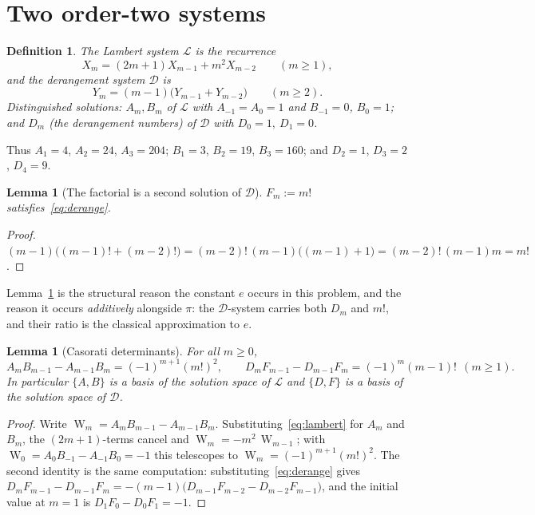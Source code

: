 \documentclass[11pt]{article}
\newtheorem{lemma}[theorem]{Lemma}
\newtheorem{definition}[theorem]{Definition}
\theoremstyle{remark}
\DeclareMathOperator{\Cas}{W}
\begin{document}
\section{Two order-two systems}

\begin{definition}
The \emph{Lambert system} $\mathcal{L}$ is the recurrence
\begin{equation}\label{eq:lambert}
X_m = (2m+1)X_{m-1} + m^2 X_{m-2} \qquad (m \ge 1),
\end{equation}
and the \emph{derangement system} $\mathcal{D}$ is
\begin{equation}\label{eq:derange}
Y_m = (m-1)\bigl(Y_{m-1} + Y_{m-2}\bigr) \qquad (m \ge 2).
\end{equation}
Distinguished solutions: $A_m,B_m$ of $\mathcal{L}$ with
$A_{-1}=A_0=1$ and $B_{-1}=0$, $B_0=1$; and $D_m$ (the derangement numbers) of
$\mathcal{D}$ with $D_0=1,\ D_1=0$.
\end{definition}

Thus $A_1=4$, $A_2=24$, $A_3=204$; $B_1=3$, $B_2=19$, $B_3=160$; and
$D_2=1$, $D_3=2$, $D_4=9$.

\begin{lemma}[The factorial is a second solution of $\mathcal{D}$]\label{lem:fact}
$F_m := m!$ satisfies~\eqref{eq:derange}.
\end{lemma}

\begin{proof}
$(m-1)\bigl((m-1)! + (m-2)!\bigr) = (m-2)!\,(m-1)\bigl((m-1)+1\bigr)
= (m-2)!\,(m-1)m = m!$.
\end{proof}

Lemma~\ref{lem:fact} is the structural reason the constant $e$ occurs in this
problem, and the reason it occurs \emph{additively} alongside $\pi$: the
$\mathcal{D}$-system carries both $D_m$ and $m!$, and their ratio is the
classical approximation to $e$.

\begin{lemma}[Casorati determinants]\label{lem:cas}
For all $m\ge 0$,
\[
A_mB_{m-1}-A_{m-1}B_m = (-1)^{m+1}(m!)^2,
\qquad
D_mF_{m-1}-D_{m-1}F_m = (-1)^{m}(m-1)!\ \ (m\ge1).
\]
In particular $\{A,B\}$ is a basis of the solution space of $\mathcal{L}$ and
$\{D,F\}$ is a basis of the solution space of $\mathcal{D}$.
\end{lemma}

\begin{proof}
Write $\Cas_m = A_mB_{m-1}-A_{m-1}B_m$. Substituting~\eqref{eq:lambert} for
$A_m$ and $B_m$, the $(2m+1)$-terms cancel and
$\Cas_m = -m^2\,\Cas_{m-1}$; with $\Cas_0 = A_0B_{-1}-A_{-1}B_0 = -1$ this
telescopes to $\Cas_m = (-1)^{m+1}(m!)^2$. The second identity is the same
computation: substituting~\eqref{eq:derange} gives
$D_mF_{m-1}-D_{m-1}F_m = -(m-1)\bigl(D_{m-1}F_{m-2}-D_{m-2}F_{m-1}\bigr)$, and
the initial value at $m=1$ is $D_1F_0-D_0F_1 = -1$.
\end{proof}
\end{document}
